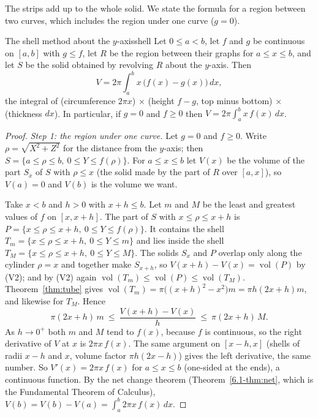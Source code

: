\documentclass[11pt]{article}
\begin{document}
The strips add up to the whole solid. We state the formula for a region between two curves, which includes the region under one curve ($g=0$).

\begin{thm}{The shell method about the $y$-axis}{shell}
Let $0\le a<b$, let $f$ and $g$ be continuous on $[a,b]$ with $g\le f$, let $R$ be the region between their graphs for $a\le x\le b$, and let $S$ be the solid obtained by revolving $R$ about the $y$-axis. Then
\[
V=2\pi\int_a^b x\,\bigl(f(x)-g(x)\bigr)\,dx ,
\]
the integral of (circumference $2\pi x$) $\times$ (height $f-g$, top minus bottom) $\times$ (thickness $dx$). In particular, if $g=0$ and $f\ge0$ then $V=2\pi\int_a^bx\,f(x)\,dx$.
\end{thm}
\begin{proof}
\emph{Step 1: the region under one curve.} Let $g=0$ and $f\ge0$. Write $\rho=\sqrt{X^2+Z^2}$ for the distance from the $y$-axis; then $S=\{a\le\rho\le b,\ 0\le Y\le f(\rho)\}$. For $a\le x\le b$ let $V(x)$ be the volume of the part $S_x$ of $S$ with $\rho\le x$ (the solid made by the part of $R$ over $[a,x]$), so $V(a)=0$ and $V(b)$ is the volume we want.

Take $x<b$ and $h>0$ with $x+h\le b$. Let $m$ and $M$ be the least and greatest values of $f$ on $[x,x+h]$. The part of $S$ with $x\le\rho\le x+h$ is $P=\{x\le\rho\le x+h,\ 0\le Y\le f(\rho)\}$. It contains the shell $T_m=\{x\le\rho\le x+h,\ 0\le Y\le m\}$ and lies inside the shell $T_M=\{x\le\rho\le x+h,\ 0\le Y\le M\}$. The solids $S_x$ and $P$ overlap only along the cylinder $\rho=x$ and together make $S_{x+h}$, so $V(x+h)-V(x)=\operatorname{vol}(P)$ by (V2); and by (V2) again $\operatorname{vol}(T_m)\le\operatorname{vol}(P)\le\operatorname{vol}(T_M)$. Theorem~\ref{thm:tube} gives $\operatorname{vol}(T_m)=\pi\bigl((x+h)^2-x^2\bigr)m=\pi h(2x+h)m$, and likewise for $T_M$. Hence
\[
\pi(2x+h)\,m\ \le\ \frac{V(x+h)-V(x)}h\ \le\ \pi(2x+h)\,M .
\]
As $h\to0^+$ both $m$ and $M$ tend to $f(x)$, because $f$ is continuous, so the right derivative of $V$ at $x$ is $2\pi x\,f(x)$. The same argument on $[x-h,x]$ (shells of radii $x-h$ and $x$, volume factor $\pi h(2x-h)$) gives the left derivative, the same number. So $V'(x)=2\pi x\,f(x)$ for $a\le x\le b$ (one-sided at the ends), a continuous function. By the net change theorem (Theorem~\ref{6.1-thm:net}, which is the Fundamental Theorem of Calculus), $V(b)=V(b)-V(a)=\int_a^b2\pi x\,f(x)\,dx$.


\end{proof}
\end{document}
